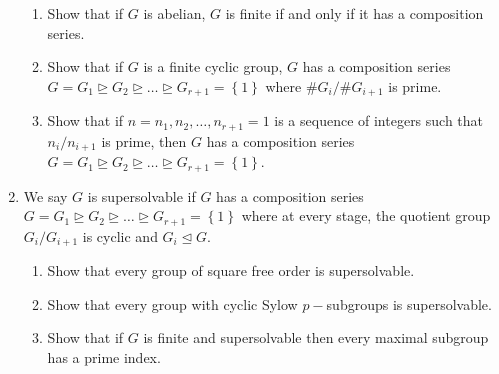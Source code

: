 \documentclass[letterpaper,12pt]{article}
\newcommand{\set}[1]{\left\{ #1 \right\}}
\begin{document}
\begin{enumerate}
\begin{enumerate}
    \item Show that if $G$ is abelian, $G$ is finite if and only if it has a composition series.
    \item Show that if $G$ is a finite cyclic group, $G$ has a composition series $G = G_1 \trianglerighteq G_2 \trianglerighteq \ldots \trianglerighteq G_{r+1} = \set{1}$ where $\#G_i/\#G_{i+1}$ is prime.
    \item Show that if $n=n_1,n_2,\ldots,n_{r+1}=1$ is a sequence of integers such that $n_{i}/n_{i+1}$ is prime, then $G$ has a composition series $G = G_1 \trianglerighteq G_2 \trianglerighteq \ldots \trianglerighteq G_{r+1} = \set{1}$.
\end{enumerate}
\item We say $G$ is supersolvable if $G$ has a composition series  $G = G_1 \trianglerighteq G_2 \trianglerighteq \ldots \trianglerighteq G_{r+1} = \set{1}$ where at every stage, the quotient group $G_i/G_{i+1}$ is cyclic and $G_i \trianglelefteq G$. \begin{enumerate}
    \item Show that every group of square free order is supersolvable.
    \item Show that every group with cyclic Sylow $p-$subgroups is supersolvable.
    \item Show that if $G$ is finite and supersolvable then every maximal subgroup has a prime index.
\end{enumerate} 
\end{enumerate}
\end{document}
